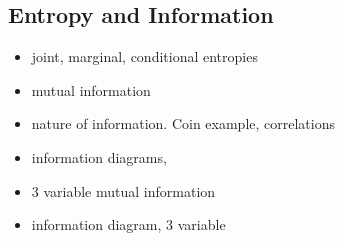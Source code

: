 \documentclass[Lectures.tex]{subfiles}
\begin{document}

\subsection{Entropy and Information}

\begin{itemize}
\item joint, marginal, conditional entropies
\item mutual information 
\item nature of information. Coin example, correlations 
\item information diagrams, 
\item 3 variable mutual information
\item information diagram, 3 variable
\end{itemize}

%
\end{document}
